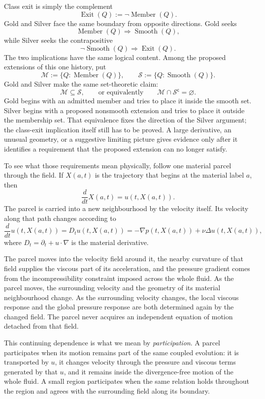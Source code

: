 Class exit is simply the complement
\[
  \operatorname{Exit}(Q)
  :=
  \neg\operatorname{Member}(Q).
\]
Gold and Silver face the same boundary from opposite directions.
Gold seeks
\[
  \operatorname{Member}(Q)
  \Longrightarrow
  \operatorname{Smooth}(Q),
\]
while Silver seeks the contrapositive
\[
  \neg\operatorname{Smooth}(Q)
  \Longrightarrow
  \operatorname{Exit}(Q).
\]
The two implications have the same logical content.
Among the proposed extensions of this one history, put
\[
  \mathcal M
  :=
  \{Q:\operatorname{Member}(Q)\},
  \qquad
  \mathcal S
  :=
  \{Q:\operatorname{Smooth}(Q)\}.
\]
Gold and Silver make the same set-theoretic claim:
\[
  \mathcal M\subseteq\mathcal S,
  \qquad\text{or equivalently}\qquad
  \mathcal M\cap\mathcal S^{\mathsf c}=\varnothing.
\]
Gold begins with an admitted member and tries to place it inside the smooth set.
Silver begins with a proposed nonsmooth extension and tries to place it outside the membership set.
That equivalence fixes the direction of the Silver argument; the class-exit implication itself still has to be proved.
A large derivative, an unusual geometry, or a suggestive limiting picture gives evidence only after it identifies a requirement that the proposed extension can no longer satisfy.


To see what those requirements mean physically, follow one material parcel through the field.
If \(X(a,t)\) is the trajectory that begins at the material label \(a\), then
\[
  \frac{d}{dt}X(a,t)=u(t,X(a,t)).
\]
The parcel is carried into a new neighbourhood by the velocity itself.
Its velocity along that path changes according to
\[
  \frac{d}{dt}u(t,X(a,t))
  =
  D_tu(t,X(a,t))
  =
  -\nabla p(t,X(a,t))
  +\nu\Delta u(t,X(a,t)),
\]
where \(D_t=\partial_t+u\cdot\nabla\) is the material derivative.

The parcel moves into the velocity field around it, the nearby curvature of that field supplies the viscous part of its acceleration, and the pressure gradient comes from the incompressibility constraint imposed across the whole fluid.
As the parcel moves, the surrounding velocity and the geometry of its material neighbourhood change.
As the surrounding velocity changes, the local viscous response and the global pressure response are both determined again by the changed field.
The parcel never acquires an independent equation of motion detached from that field.

This continuing dependence is what we mean by \emph{participation}.
A parcel participates when its motion remains part of the same coupled evolution: it is transported by \(u\), it changes velocity through the pressure and viscous terms generated by that \(u\), and it remains inside the divergence-free motion of the whole fluid.
A small region participates when the same relation holds throughout the region and agrees with the surrounding field along its boundary.


